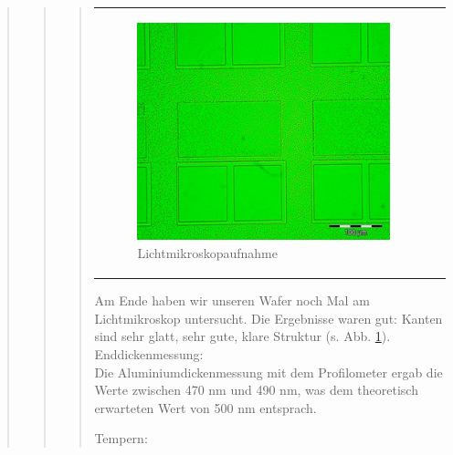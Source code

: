 \begin{quote}
\begin{quote}
\begin{quote}
\begin{center}
\begin{tabular}{ll}
\begin{minipage}{0.7\textwidth}
                    \end{minipage}
                    \begin{minipage}{0.5\textwidth} 

                        \begin{figure}[H]
                        \hspace{0em}
                            \includegraphics[scale=0.9, trim = 0cm 0cm 0cm
                            0cm, clip]
                            {./HerstellungBilder/LichtmikroskopbildEndstruktur.png}
                            \caption{Lichtmikroskopaufnahme}
                           \label{fig:auflicht}
                        \end{figure}
                    \vspace{-1.5em}

                    \end{minipage}

                \end{tabular}
			\end{center}
    
    		\vspace{2em}
    		
    		Am Ende haben wir unseren Wafer noch Mal am Lichtmikroskop 
    		untersucht. Die Ergebnisse waren gut: Kanten sind sehr glatt, 
    		sehr gute, klare Struktur (s. Abb. \ref{fig:auflicht}).\\

			Enddickenmessung:\\

			Die Aluminiumdickenmessung mit dem Profilometer ergab die Werte 
			zwischen 470 nm und 490 nm, was dem theoretisch erwarteten Wert von
			500 nm entsprach. 

			Tempern:\\ 


\end{quote}
\end{quote}
\end{quote}
